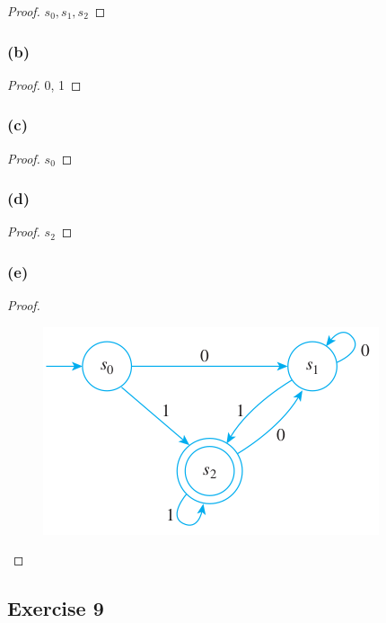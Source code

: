 \documentclass[14pt]{extarticle}
\begin{document}
\begin{proof}
\(s_0, s_1, s_2\)
\end{proof}

\subsubsection{(b)}

\begin{proof}
0, 1
\end{proof}

\subsubsection{(c)}

\begin{proof}
\(s_0\)
\end{proof}

\subsubsection{(d)}

\begin{proof}
\(s_2\)
\end{proof}

\subsubsection{(e)}

\begin{proof}
\begin{figure}[ht!]
\centering
\includegraphics[scale=0.5]{../images/12.2.8.e.png}
\end{figure}
\end{proof}

\subsection{Exercise 9}
\end{document}
